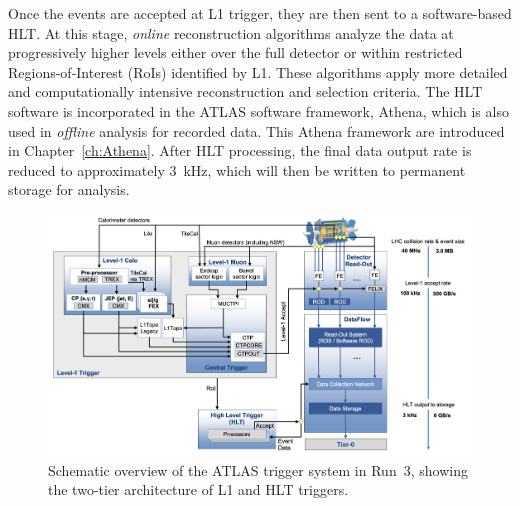 Once the events are accepted at L1 trigger, they are then sent to a software-based HLT. At this stage, \textit{online} reconstruction algorithms analyze the data at progressively higher levels either over the full detector or within restricted Regions-of-Interest (RoIs) identified by L1. These algorithms apply more detailed and computationally intensive reconstruction and selection criteria. The HLT software is incorporated in the ATLAS software framework, Athena, which is also used in \textit{offline} analysis for recorded data. This Athena framework are introduced in Chapter~\ref{ch:Athena}. After HLT processing, the final data output rate is reduced to approximately 3~kHz, which will then be written to permanent storage for analysis.

\begin{figure}[htbp]
  \centering
  \includegraphics[width=1.0\textwidth]{figs/chapter2/trigger_run3_1.png}
  \caption{Schematic overview of the ATLAS trigger system in Run~3, showing the two-tier architecture of L1 and HLT triggers.}
  \label{fig:trigger_run3}
\end{figure}

